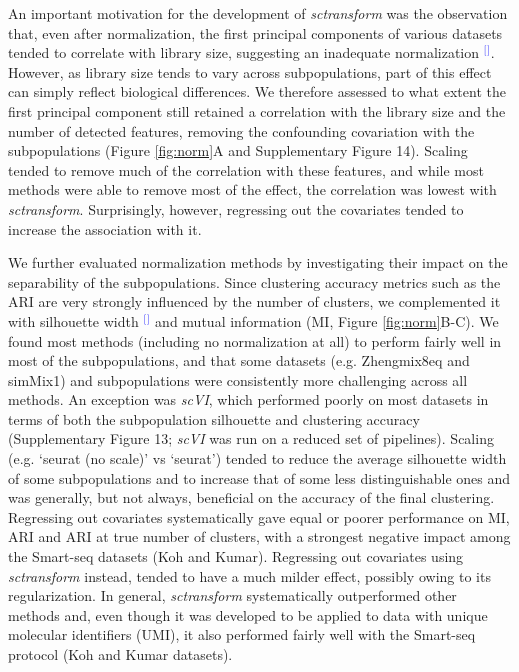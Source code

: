 \documentclass[11pt]{article}
\renewcommand{\cite}[1]{\textcolor{Blue}{$^[$\supercite{#1}$^]$}}
\begin{document}
An important motivation for the development of \textit{sctransform} was the observation that, even after normalization, the first principal components of various datasets tended to correlate with library size, suggesting an inadequate normalization \cite{hafemeisterSCtransform2019}. However, as library size tends to vary across subpopulations, part of this effect can simply reflect biological differences. We therefore assessed to what extent the first principal component still retained a correlation with the library size and the number of detected features, removing the confounding covariation with the subpopulations (Figure \ref{fig:norm}A and Supplementary Figure 14). Scaling tended to remove much of the correlation with these features, and while most methods were able to remove most of the effect, the correlation was lowest with \textit{sctransform}. Surprisingly, however, regressing out the covariates tended to increase the association with it.

We further evaluated normalization methods by investigating their impact on the separability of the subpopulations. Since clustering accuracy metrics such as the ARI are very strongly influenced by the number of clusters, we complemented it with silhouette width \cite{RousseeuwSil1987} and mutual information (MI, Figure \ref{fig:norm}B-C). We found most methods (including no normalization at all) to perform fairly well in most of the subpopulations{\color{red}, and that some datasets (e.g. Zhengmix8eq and simMix1) and subpopulations were consistently more challenging across all methods. An exception was \textit{scVI}, which performed poorly on most datasets in terms of both the subpopulation silhouette and clustering accuracy (Supplementary Figure 13; \textit{scVI} was run on a reduced set of pipelines). Scaling (e.g. `seurat (no scale)' vs `seurat') tended to reduce the average silhouette width of some subpopulations and to increase that of some less distinguishable ones and was generally, but not always, beneficial on the accuracy of the final clustering. Regressing out covariates systematically gave equal or poorer performance on MI, ARI and ARI at true number of clusters, with a strongest negative impact among the Smart-seq datasets (Koh and Kumar). Regressing out covariates using \textit{sctransform} instead, tended to have a much milder effect, possibly owing to its regularization. In general, \textit{sctransform} systematically outperformed other methods and, even though it was developed to be applied to data with unique molecular identifiers (UMI), it also performed fairly well with the Smart-seq protocol (Koh and Kumar datasets).}
\end{document}
